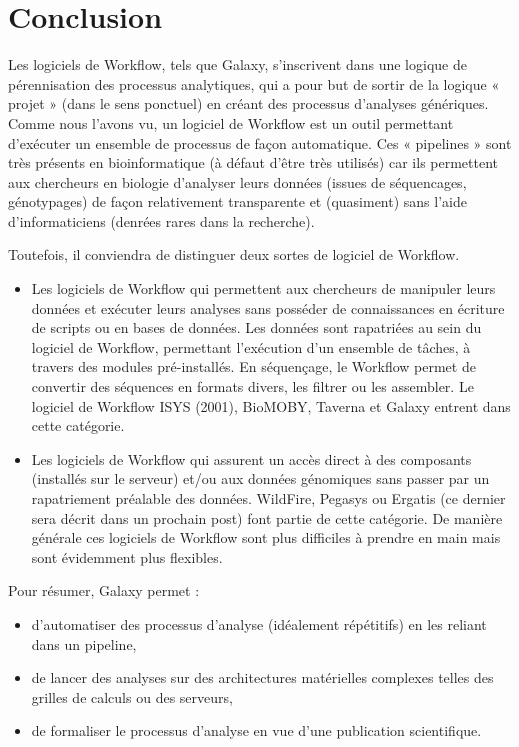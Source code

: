 \chapter*{Conclusion}

Les logiciels de Workflow, tels que Galaxy, s’inscrivent dans une logique de pérennisation des processus analytiques, qui a pour but de sortir de la logique « projet » (dans le sens ponctuel) en créant des processus d’analyses génériques. Comme nous l'avons vu, un logiciel de Workflow est un outil permettant d'exécuter un ensemble de processus de façon automatique. Ces « pipelines » sont très présents en bioinformatique (à défaut d’être très utilisés) car ils permettent aux chercheurs en biologie d’analyser leurs données (issues de séquencages, génotypages) de façon relativement transparente et (quasiment) sans l’aide d’informaticiens (denrées rares dans la recherche).

Toutefois, il conviendra de distinguer deux sortes de logiciel de Workflow.
\begin{itemize}
\item{Les logiciels de Workflow qui permettent aux chercheurs de manipuler leurs données et exécuter leurs analyses sans posséder de connaissances en écriture de scripts ou en bases de données. Les données sont rapatriées au sein du logiciel de Workflow, permettant l’exécution d’un ensemble de tâches, à travers des modules pré-installés. En séquençage, le Workflow permet de convertir des séquences en formats divers, les filtrer ou les assembler. Le logiciel de Workflow ISYS (2001), BioMOBY, Taverna et Galaxy entrent dans cette catégorie.}

\item{Les logiciels de Workflow qui assurent un accès direct à des composants (installés sur le serveur) et/ou aux données génomiques sans passer par un rapatriement préalable des données. WildFire, Pegasys ou Ergatis (ce dernier sera décrit dans un prochain post) font partie de cette catégorie. De manière générale ces logiciels de Workflow sont plus difficiles à prendre en main mais sont évidemment plus flexibles.}
\end{itemize}
Pour résumer, Galaxy permet :
\begin{itemize}
\item{d’automatiser des processus d’analyse (idéalement répétitifs) en les reliant dans un pipeline,}
\item{de lancer des analyses sur des architectures matérielles complexes telles des grilles de calculs ou des serveurs,}
\item{de formaliser le processus d’analyse en vue d’une publication scientifique.}
\end{itemize}